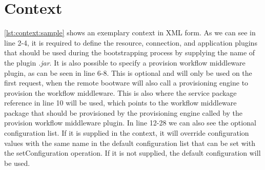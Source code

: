 \section{Context}
\label{implementation:context}

\vspace*{\baselineskip}

\autoref{lst:context:sample} shows an exemplary context in XML form.
As we can see in line 2-4, it is required to define the resource, connection, and application plugins that should be used during the bootstrapping process by supplying the name of the plugin \textit{.jar}.
It is also possible to specify a provision workflow middleware plugin, as can be seen in line 6-8.
This is optional and will only be used on the first request, when the remote bootware will also call a provisioning engine to provision the workflow middleware.
This is also where the service package reference in line 10 will be used, which points to the workflow middleware package that should be provisioned by the provisioning engine called by the provision workflow middleware plugin.
In line 12-28 we can also see the optional configuration list.
If it is supplied in the context, it will override configuration values with the same name in the default configuration list that can be set with the setConfiguration operation.
If it is not supplied, the default configuration will be used.
